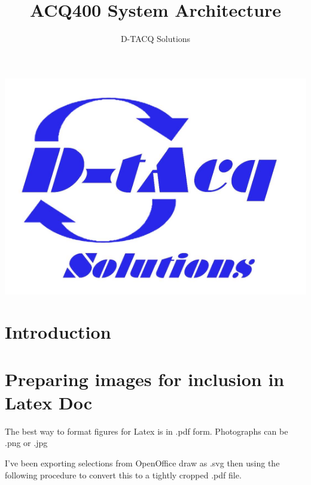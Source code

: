 \documentclass[]{article}
\title{ACQ400 System Architecture}
\author{D-TACQ Solutions}
\begin{document}
\maketitle
\thispagestyle{empty} %
\begin{center}
\includegraphics{images/dtacq_logo_new}
\end{center}

\begin{abstract}
\lipsum[1-2]
\end{abstract}

\begin{versionhistory}
\end{versionhistory}
\setcounter{table}{0} %

\pagebreak

\tableofcontents

\section{Introduction}
\lipsum[1-3]

\section{Preparing images for inclusion in Latex Doc}
The best way to format figures for Latex is in .pdf form. Photographs can be .png or .jpg

I've been exporting selections from OpenOffice draw as .svg then using the following procedure to convert this to a tightly cropped .pdf file.
\end{document}
